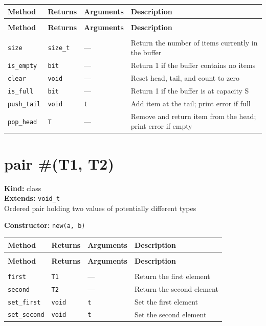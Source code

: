 \documentclass[11pt,letterpaper]{report}
\begin{document}
\begin{xltabular}{\linewidth}{>{\small}p{1.35in} >{\small}p{1.25in} >{\small}p{0.95in} >{\small}X}
\toprule
\textbf{Method} & \textbf{Returns} & \textbf{Arguments} & \textbf{Description} \\
\midrule
\endfirsthead
{} \\
\midrule
\textbf{Method} & \textbf{Returns} & \textbf{Arguments} & \textbf{Description} \\
\midrule
\endhead
\midrule
{} \\
\endfoot
\bottomrule
\endlastfoot
\texttt{size} & \texttt{size\_t} & --- & Return the number of items currently in the buffer \\
\texttt{is\_empty} & \texttt{bit} & --- & Return 1 if the buffer contains no items \\
\texttt{clear} & \texttt{void} & --- & Reset head, tail, and count to zero \\
\texttt{is\_full} & \texttt{bit} & --- & Return 1 if the buffer is at capacity S \\
\texttt{push\_tail} & \texttt{void} & \texttt{t} & Add item at the tail; print error if full \\
\texttt{pop\_head} & \texttt{T} & --- & Remove and return item from the head; print error if empty \\
\end{xltabular}

\section{pair \#(T1, T2)}
\label{cls:pairT1T2}

\noindent\textbf{Kind:} class\\
\noindent\textbf{Extends:} \texttt{void\_t}\\
\noindent Ordered pair holding two values of potentially different types

\noindent\textbf{Constructor:} \texttt{new(a, b)}

\begin{xltabular}{\linewidth}{>{\small}p{1.35in} >{\small}p{1.25in} >{\small}p{0.95in} >{\small}X}
\toprule
\textbf{Method} & \textbf{Returns} & \textbf{Arguments} & \textbf{Description} \\
\midrule
\endfirsthead
{} \\
\midrule
\textbf{Method} & \textbf{Returns} & \textbf{Arguments} & \textbf{Description} \\
\midrule
\endhead
\midrule
{} \\
\endfoot
\bottomrule
\endlastfoot
\texttt{first} & \texttt{T1} & --- & Return the first element \\
\texttt{second} & \texttt{T2} & --- & Return the second element \\
\texttt{set\_first} & \texttt{void} & \texttt{t} & Set the first element \\
\texttt{set\_second} & \texttt{void} & \texttt{t} & Set the second element \\
\end{xltabular}
\end{document}
